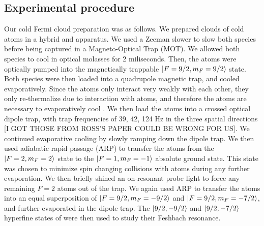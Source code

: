 \documentclass[12pt]{iopart}
\begin{document}
\subsection{Experimental procedure}
Our cold Fermi cloud preparation was as follows. We prepared clouds of cold \K{} atoms in a hybrid \K{} and \Rb{} apparatus. We used a Zeeman slower to slow both species before being captured in a Magneto-Optical Trap (MOT). We allowed both species to cool in optical molasses for 2 miliseconds. Then, the \K{} atoms were optically pumped into the magnetically trappable $\mathinner{|{F=9/2, m_F=9/2}\rangle}$ state. Both species were then loaded into a quadrupole magnetic trap, and cooled evaporatively. Since the \K{} atoms only interact very weakly with each other, they only re-thermalize due to interaction with \Rb{} atoms, and therefore the \Rb{} atoms are necessary to evaporatively cool \K{}. We then load the atoms into a crossed optical dipole trap, with trap frequencies of 39, 42, 124 Hz in the three spatial directions [I GOT THOSE FROM ROSS'S PAPER COULD BE WRONG FOR US]. We continued evaporative cooling by slowly ramping down the dipole trap. We then used adiabatic rapid passage (ARP) to transfer the \Rb{} atoms from the $\mathinner{|{F=2, m_F=2}\rangle}$ state to the  $\mathinner{|{F=1, m_F=-1}\rangle}$ absolute ground state. This state was chosen to minimize spin changing collisions with \K{} atoms during any further evaporation.  We then briefly shined an on-resonant probe light to force any remaining $F=2$ atoms out of the trap. We again used ARP to transfer the \K{} atoms into an equal superposition of $\mathinner{|{F=9/2,m_F=-9/2}\rangle}$ and $\mathinner{|{F=9/2,m_F=-7/2}\rangle}$, and further evaporated in the dipole trap. The $\mathinner{|{9/2,-9/2}\rangle}$ and $\mathinner{|{9/2,-7/2}\rangle}$ hyperfine states of \K{} were then used to study their Feshbach resonance. 
\end{document}
